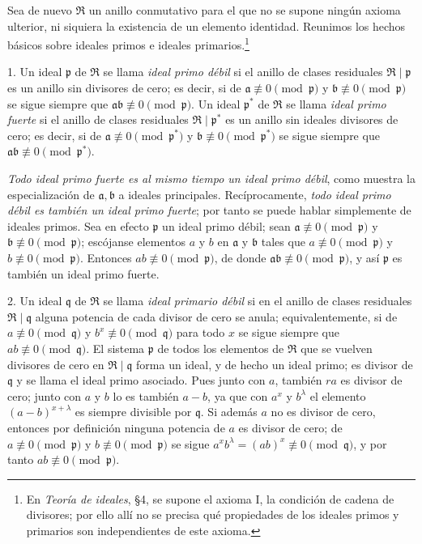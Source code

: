 \documentclass[11pt]{article}
\providecommand{\mR}{\mathfrak{R}}
\providecommand{\ma}{\mathfrak{a}}
\providecommand{\mb}{\mathfrak{b}}
\providecommand{\mpideal}{\mathfrak{p}}
\providecommand{\mq}{\mathfrak{q}}
\begin{document}
Sea de nuevo $\mR$ un anillo conmutativo para el que no se supone ningún axioma ulterior, ni siquiera la existencia de un elemento identidad. Reunimos los hechos básicos sobre ideales primos e ideales primarios.\footnote{En \emph{Teoría de ideales}, §4, se supone el axioma I, la condición de cadena de divisores; por ello allí no se precisa qué propiedades de los ideales primos y primarios son independientes de este axioma.}

1. Un ideal $\mpideal$ de $\mR$ se llama \emph{ideal primo débil} si el anillo de clases residuales $\mR\mid\mpideal$ es un anillo sin divisores de cero; es decir, si de $\ma\not\equiv0\pmod{\mpideal}$ y $\mb\not\equiv0\pmod{\mpideal}$ se sigue siempre que $\ma\mb\not\equiv0\pmod{\mpideal}$. Un ideal $\mpideal^*$ de $\mR$ se llama \emph{ideal primo fuerte} si el anillo de clases residuales $\mR\mid\mpideal^*$ es un anillo sin ideales divisores de cero; es decir, si de $\ma\not\equiv0\pmod{\mpideal^*}$ y $\mb\not\equiv0\pmod{\mpideal^*}$ se sigue siempre que $\ma\mb\not\equiv0\pmod{\mpideal^*}$.

\emph{Todo ideal primo fuerte es al mismo tiempo un ideal primo débil}, como muestra la especialización de $\ma,\mb$ a ideales principales. Recíprocamente, \emph{todo ideal primo débil es también un ideal primo fuerte}; por tanto se puede hablar simplemente de ideales primos. Sea en efecto $\mpideal$ un ideal primo débil; sean $\ma\not\equiv0\pmod{\mpideal}$ y $\mb\not\equiv0\pmod{\mpideal}$; escójanse elementos $a$ y $b$ en $\ma$ y $\mb$ tales que $a\not\equiv0\pmod{\mpideal}$ y $b\not\equiv0\pmod{\mpideal}$. Entonces $ab\not\equiv0\pmod{\mpideal}$, de donde $\ma\mb\not\equiv0\pmod{\mpideal}$, y así $\mpideal$ es también un ideal primo fuerte.

2. Un ideal $\mq$ de $\mR$ se llama \emph{ideal primario débil} si en el anillo de clases residuales $\mR\mid\mq$ alguna potencia de cada divisor de cero se anula; equivalentemente, si de $a\not\equiv0\pmod{\mq}$ y $b^x\not\equiv0\pmod{\mq}$ para todo $x$ se sigue siempre que $ab\not\equiv0\pmod{\mq}$. El sistema $\mpideal$ de todos los elementos de $\mR$ que se vuelven divisores de cero en $\mR\mid\mq$ forma un ideal, y de hecho un ideal primo; es divisor de $\mq$ y se llama el ideal primo asociado. Pues junto con $a$, también $ra$ es divisor de cero; junto con $a$ y $b$ lo es también $a-b$, ya que con $a^x$ y $b^\lambda$ el elemento $(a-b)^{x+\lambda}$ es siempre divisible por $\mq$. Si además $a$ no es divisor de cero, entonces por definición ninguna potencia de $a$ es divisor de cero; de $a\not\equiv0\pmod{\mpideal}$ y $b\not\equiv0\pmod{\mpideal}$ se sigue $a^x b^\lambda=(ab)^x\not\equiv0\pmod{\mq}$, y por tanto $ab\not\equiv0\pmod{\mpideal}$.
\end{document}
